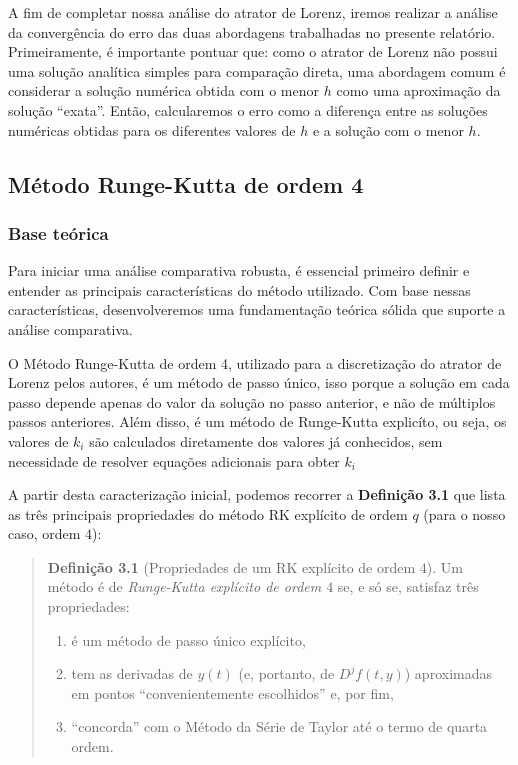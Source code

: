 \documentclass[12pt, a4paper]{article}
\begin{document}
    A fim de completar nossa análise do atrator de Lorenz, iremos realizar a análise da convergência do erro das duas abordagens trabalhadas no presente relatório. Primeiramente, é importante pontuar que: como o atrator de Lorenz não possui uma solução analítica simples para comparação direta, uma abordagem comum é considerar a solução numérica obtida com o menor $h$ como uma aproximação da solução ``exata''. Então, calcularemos o erro como a diferença entre as soluções numéricas obtidas para os diferentes valores de $h$ e a solução com o menor $h$.
    
    \subsection{Método Runge-Kutta de ordem 4}
    \subsubsection{Base teórica}
    Para iniciar uma análise comparativa robusta, é essencial primeiro definir e entender as principais características do método utilizado. Com base nessas características, desenvolveremos uma fundamentação teórica sólida que suporte a análise comparativa.
    
    O Método Runge-Kutta de ordem 4, utilizado para a discretização do atrator de Lorenz pelos autores, é um método de passo único, isso porque a solução em cada passo depende apenas do valor da solução no passo anterior, e não de múltiplos passos anteriores. Além disso, é um método de Runge-Kutta explicíto, ou seja, os valores de $k_i$ são calculados diretamente dos valores já conhecidos, sem necessidade de resolver equações adicionais para obter $k_i$
    
    A partir desta caracterização inicial, podemos recorrer a \textbf{Definição 3.1} \cite{roma2023} que lista as três principais propriedades do método RK explícito de ordem $q$ (para o nosso caso, ordem $4$):
    
    \begin{quote}
        \fontsize{10}{12}\selectfont
        \textbf{Definição 3.1} (Propriedades de um RK explícito de ordem $4$). Um método é de \textit{Runge-Kutta explícito de ordem $4$} se, e só se, satisfaz três propriedades:
    
    \begin{enumerate}
        \item é um método de passo único explícito,
        \item tem as derivadas de $y(t)$ (e, portanto, de $D^j f(t,y)$) aproximadas em pontos ``convenientemente escolhidos'' e, por fim,
        \item ``concorda'' com o Método da Série de Taylor até o termo de quarta ordem.
    \end{enumerate}
    \end{quote}
    
\end{document}
